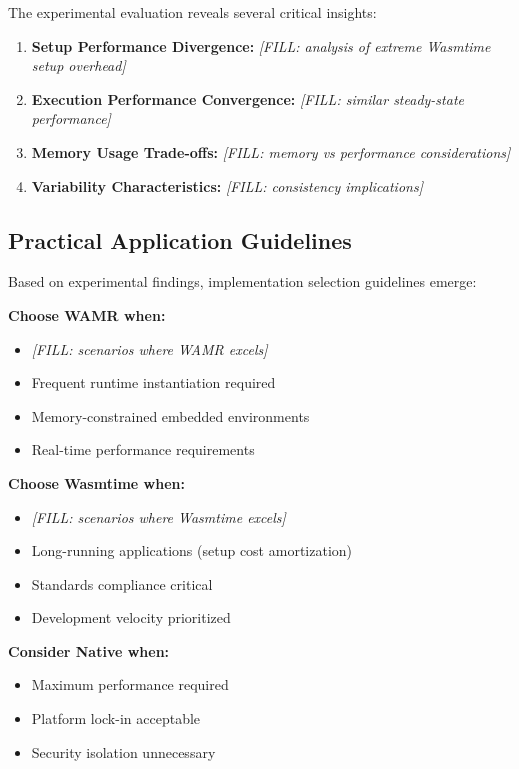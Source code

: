 The experimental evaluation reveals several critical insights:

\begin{enumerate}
    \item \textbf{Setup Performance Divergence:} \textit{[FILL: analysis of extreme Wasmtime setup overhead]}
    \item \textbf{Execution Performance Convergence:} \textit{[FILL: similar steady-state performance]}
    \item \textbf{Memory Usage Trade-offs:} \textit{[FILL: memory vs performance considerations]}
    \item \textbf{Variability Characteristics:} \textit{[FILL: consistency implications]}
\end{enumerate}

\subsection{Practical Application Guidelines}
\label{subsec:application-guidelines}

Based on experimental findings, implementation selection guidelines emerge:

\textbf{Choose WAMR when:}
\begin{itemize}
    \item \textit{[FILL: scenarios where WAMR excels]}
    \item Frequent runtime instantiation required
    \item Memory-constrained embedded environments
    \item Real-time performance requirements
\end{itemize}

\textbf{Choose Wasmtime when:}
\begin{itemize}
    \item \textit{[FILL: scenarios where Wasmtime excels]}
    \item Long-running applications (setup cost amortization)
    \item Standards compliance critical
    \item Development velocity prioritized
\end{itemize}

\textbf{Consider Native when:}
\begin{itemize}
    \item Maximum performance required
    \item Platform lock-in acceptable
    \item Security isolation unnecessary
\end{itemize}

